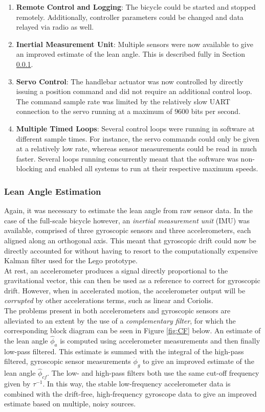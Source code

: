\begin{enumerate}
\item{\textbf{Remote Control and Logging}: The bicycle could be started and stopped remotely. Additionally, controller parameters could be changed and data relayed via radio as well.}
\item{\textbf{Inertial Measurement Unit}: Multiple sensors were now available to give an improved estimate of the lean angle. This is described fully in Section \ref{leanangleestimatefs}.}
\item{\textbf{Servo Control}: The handlebar actuator was now controlled by directly issuing a position command and did not require an additional control loop. The command sample rate was limited by the relatively slow UART connection to the servo running at a maximum of $9600$ bits per second.}
\item{\textbf{Multiple Timed Loops}: Several control loops were running in software at different sample times. For instance, the servo commands could only be given at a relatively low rate, whereas sensor measurements could be read in much faster. Several loops running concurrently meant that the software was non-blocking and enabled all systems to run at their respective maximum speeds.}
\end{enumerate}

\subsubsection{Lean Angle Estimation} \label{leanangleestimatefs}
Again, it was necessary to estimate the lean angle from raw sensor data. In the case of the full-scale bicycle however, an \textit{inertial measurement unit} (IMU) was available, comprised of three gyroscopic sensors and three accelerometers, each aligned along an orthogonal axis. This meant that gyroscopic drift could now be directly accounted for without having to resort to the computationally expensive Kalman filter used for the Lego prototype.\\

At rest, an accelerometer produces a signal directly proportional to the gravitational vector, this can then be used as a reference to correct for gyroscopic drift. However, when in accelerated motion, the accelerometer output will be \textit{corrupted} by other accelerations terms, such as linear and Coriolis. \\

The problems present in both accelerometers and gyroscopic sensors are alleviated to an extent by the use of a \textit{complementary filter}, for which the corresponding block diagram can be seen in Figure \ref{fig:CF} below. An estimate of the lean angle $\hat{\phi}_a$ is computed using accelerometer measurements and then finally low-pass filtered. This estimate is summed with the integral of the high-pass filtered, gyroscopic sensor measurements $\dot{\phi}_g$ to give an improved estimate of the lean angle $\hat{\phi}_{cf}$. The low- and high-pass filters both use the same cut-off frequency given by $\tau^{-1}$. In this way, the stable low-frequency accelerometer data is combined with the drift-free, high-frequency gyroscope data to give an improved estimate based on multiple, noisy sources.

